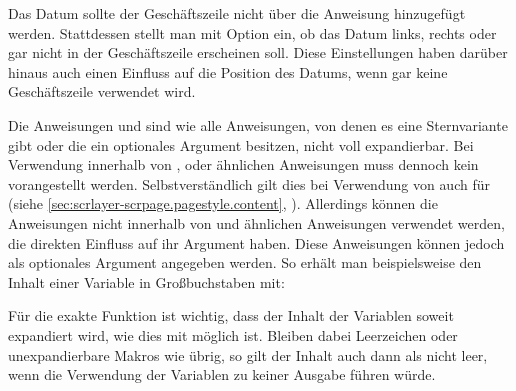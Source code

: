 Das Datum sollte der Geschäftszeile nicht über die
Anweisung  hinzugefügt werden. Stattdessen stellt man
mit Option %
%
%
%
 ein, ob das Datum links, rechts oder
gar nicht in der Geschäftszeile erscheinen soll. Diese Einstellungen haben
darüber hinaus auch einen Einfluss auf die Position des Datums, wenn gar keine
Geschäftszeile verwendet wird.%
%
\EndIndexGroup


\begin{Declaration}
\end{Declaration}
Die Anweisungen  und
 sind wie alle Anweisungen, von denen es
eine Sternvariante gibt oder die ein optionales Argument besitzen, nicht voll
expandierbar.  Bei Verwendung innerhalb von
,
 oder ähnlichen
Anweisungen muss dennoch kein  vorangestellt
werden. Selbstverständlich gilt dies bei Verwendung von
\hyperref[cha:scrlayer-scrpage]{}%
 auch für
 (siehe
\autoref{sec:scrlayer-scrpage.pagestyle.content},
).  Allerdings
können die Anweisungen nicht innerhalb von
und ähnlichen Anweisungen verwendet werden, die direkten Einfluss auf ihr
Argument haben. Diese Anweisungen können jedoch als optionales Argument
angegeben werden. So erhält man beispielsweise den Inhalt einer Variable in
Großbuchstaben mit:
\begin{lstcode}[escapeinside=><]
\end{lstcode}
%
\EndIndexGroup


\begin{Declaration}
\end{Declaration}
Für die exakte Funktion ist wichtig, dass der Inhalt der Variablen soweit
expandiert wird, wie dies mit  möglich ist. Bleiben dabei
Leerzeichen oder unexpandierbare Makros wie  übrig, so gilt der
Inhalt auch dann als nicht leer, wenn die Verwendung der Variablen zu keiner
Ausgabe führen würde.


